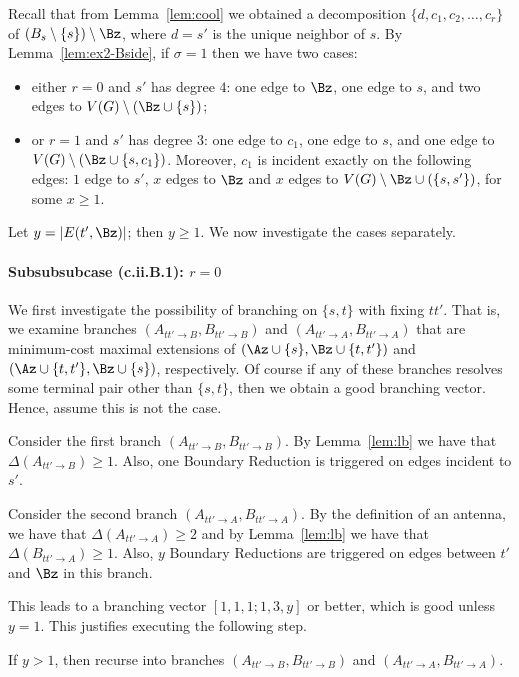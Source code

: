 Recall that from Lemma~\ref{lem:cool} we obtained a decomposition $\{d,c_1,c_2,\ldots,c_r\}$ of $(B_{s}\setminus \{s\})\setminus \Bz$, where $d=s'$ is the unique neighbor of $s$. By Lemma~\ref{lem:ex2-Bside}, if $\sigma=1$ then we have two cases:
\begin{itemize}
\item either $r=0$ and $s'$ has degree $4$: one edge to $\Bz$, one edge to $s$, and two edges to $V(G)\setminus (\Bz\cup \{s\})$;
\item or $r=1$ and $s'$ has degree $3$: one edge to $c_1$, one edge to $s$, and one edge to $V(G)\setminus (\Bz\cup \{s,c_1\})$. Moreover, $c_1$ is incident exactly on the following edges: $1$ edge to $s'$, $x$ edges to $\Bz$ and $x$ edges to $V(G)\setminus \Bz\cup (\{s,s'\})$, for some $x\geq 1$.
\end{itemize}
Let $y=|E(t',\Bz)|$; then $y\geq 1$. We now investigate the cases separately.






\paragraph*{Subsubsubcase (c.ii.B.1): $r=0$}

We first investigate the possibility of branching on $\{s,t\}$ with fixing $tt'$. That is, we examine branches $(A_{tt'\to B},B_{tt'\to B})$ and $(A_{tt'\to A},B_{tt'\to A})$ that are minimum-cost maximal extensions of $(\Az\cup \{s\},\Bz\cup \{t,t'\})$ and $(\Az\cup \{t,t'\},\Bz\cup \{s\})$, respectively. Of course if any of these branches resolves some terminal pair other than $\{s,t\}$, then we obtain a good branching vector. Hence, assume this is not the case. 

Consider the first branch $(A_{tt'\to B},B_{tt'\to B})$. By Lemma~\ref{lem:lb} we have that $\Delta(A_{tt'\to B})\geq 1$. Also, one Boundary Reduction is triggered on edges incident to $s'$. 

Consider the second branch $(A_{tt'\to A},B_{tt'\to A})$. By the definition of an antenna, we have that $\Delta(A_{tt'\to A})\geq 2$ and by Lemma~\ref{lem:lb} we have that $\Delta(B_{tt'\to A})\geq 1$. Also, $y$ Boundary Reductions are triggered on edges between $t'$ and $\Bz$ in this branch.

This leads to a branching vector $[1,1,1;1,3,y]$ or better, which is good unless $y=1$.
This justifies executing the following step.

\begin{branching}
If $y>1$, then recurse into branches $(A_{tt'\to B},B_{tt'\to B})$ and $(A_{tt'\to A},B_{tt'\to A})$.
\end{branching}


